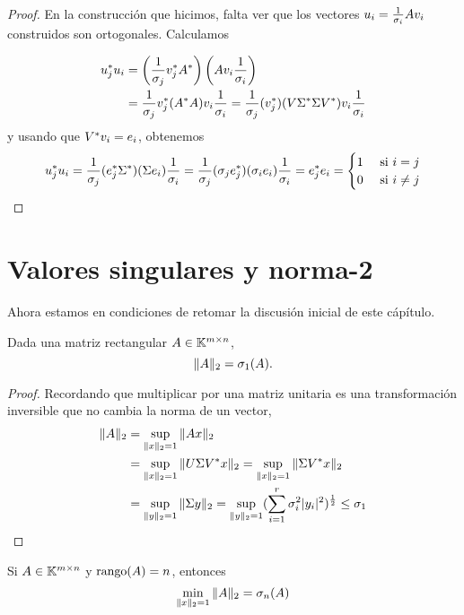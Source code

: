 \begin{proof}
En la construcción que hicimos, falta ver que los vectores $\ub_i = \frac{1}{\sigma_i} \Ab \vb_i$ construidos son ortogonales. Calculamos

$$
\begin{aligned}
\ub_j^* \ub_i &= \left(\frac{1}{\sigma_j} \vb_j^* \Ab^* \right) \left(\Ab \vb_i  \frac{1}{\sigma_i}\right) \\
&= \frac{1}{\sigma_j} \vb_j^* ( \Ab^* \Ab) \vb_i  \frac{1}{\sigma_i} = \frac{1}{\sigma_j} (\vb_j^*) ( \Vb \Sigmab^* \Sigmab \Vb^*) \vb_i  \frac{1}{\sigma_i}
\end{aligned}
$$
y usando que $\Vb^* \vb_i = \eb_i$, obtenemos
$$
\ub_j^* \ub_i = \frac{1}{\sigma_j} (\eb_j^* \Sigmab^*) (\Sigmab \eb_i)  \frac{1}{\sigma_i}
 = \frac{1}{\sigma_j} (\sigma_j \eb_j^*) ( \sigma_i \eb_i)  \frac{1}{\sigma_i} = \eb_j^* \eb_i
 = \begin{cases} 1 & \text{ si } i = j \\
 0 & \text{ si } i \neq j
 \end{cases}
$$
\end{proof}

\section{Valores singulares y norma-2}

Ahora estamos en condiciones de retomar la discusión inicial de este cápítulo.

\begin{teorema}
Dada una matriz rectangular $\Ab \in \K^{m \times n}$,
$$
\|\Ab\|_2 = \sigma_1(\Ab).
$$
\end{teorema}

\begin{proof}
 Recordando que multiplicar por una matriz unitaria es una transformación inversible que no cambia la norma de un vector,
$$
\begin{aligned}
\|\Ab\|_2 &= \sup_{\|\xb\|_2 = 1} \|\Ab\xb\|_2 \\
& = \sup_{\|\xb\|_2 = 1} \|\Ub \Sigmab \Vb^* \xb\|_2 = \sup_{\|\xb\|_2 = 1} \|\Sigmab \Vb^* \xb\|_2 \\
&= \sup_{\|\yb\|_2 = 1} \|\Sigmab \yb \|_2  = \sup_{\|\yb\|_2 = 1} (\sum_{i=1}^r \sigma_i^2 |y_i|^2)^{\frac12} \le \sigma_1
\end{aligned}
$$
\end{proof}

\begin{proposicion} Si $\Ab \in \K^{m \times n}$ y $\rank(\Ab) = n$, entonces
$$
\min_{\|x\|_2=1} \|\Ab\|_2 = \sigma_n(\Ab)
$$
\end{proposicion}


